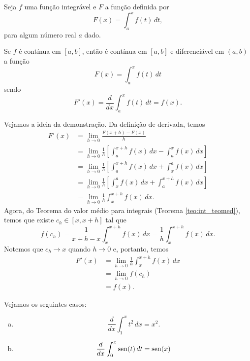 Seja $f$ uma função integrável e $F$ a função definida por
\begin{equation}
  F(x) = \int_a^x f(t)\,dt,
\end{equation}
para algum número real $a$ dado.

\begin{teo}\label{teo:int_tfc1}
  Se $f$ é contínua em $[a, b]$, então é contínua em $[a, b]$ e diferenciável em $(a, b)$ a função
  \begin{equation}
    F(x) = \int_a^x f(t)\,dt
  \end{equation}
  sendo
  \begin{equation}
    F'(x) = \frac{d}{dx}\int_a^x f(t)\,dt = f(x).
  \end{equation}
\end{teo}
\begin{dem}
  Vejamos a ideia da demonstração. Da definição de derivada, temos
  \begin{align}
    F'(x) &= \lim_{h\to 0} \frac{F(x+h) - F(x)}{h} \\
          &= \lim_{h\to 0} \frac{1}{h}\left[\int_a^{x+h} f(x)\,dx - \int_a^x f(x)\, dx\right] \\
          &= \lim_{h\to 0} \frac{1}{h}\left[\int_a^{x+h} f(x)\,dx + \int_x^a f(x)\, dx\right] \\
          &= \lim_{h\to 0} \frac{1}{h}\left[\int_x^a f(x)\, dx + \int_a^{x+h} f(x)\,dx\right] \\
          &= \lim_{h\to 0} \frac{1}{h}\int_x^{x+h} f(x)\,dx.
  \end{align}
  Agora, do Teorema do valor médio para integrais (Teorema \ref{teo:int_teomed}), temos que existe $c_h \in [x, x+h]$ tal que
  \begin{equation}
    f(c_h) = \frac{1}{x+h-x}\int_x^{x+h} f(x)\,dx = \frac{1}{h}\int_x^{x+h} f(x)\,dx.
  \end{equation}
  Notemos que $c_h\to x$ quando $h\to 0$ e, portanto, temos
  \begin{align}
    F'(x) &= \lim_{h\to 0} \frac{1}{h}\int_x^{x+h} f(x)\,dx \\
          &= \lim_{h\to 0} f(c_h) \\
          &= f(x).
  \end{align}
\end{dem}

\begin{ex}
  Vejamos os seguintes casos:
  \begin{enumerate}[a)]
  \item
    \begin{equation}
      \frac{d}{dx}\int_1^x t^2\,dx = x^2.
    \end{equation}
  \item
    \begin{equation}
      \frac{d}{dx}\int_0^x \operatorname{sen}(t)\,dt = \operatorname{sen}(x)
    \end{equation}
  \end{enumerate}
\end{ex}

